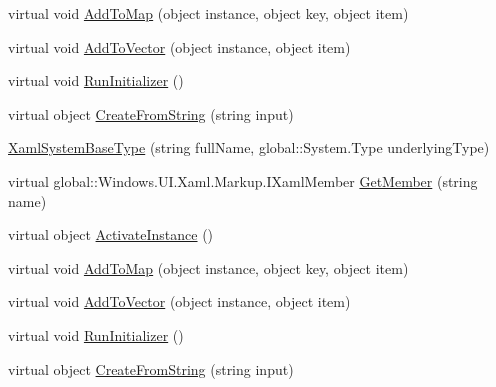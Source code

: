 \begin{DoxyCompactItemize}
\item 
virtual void \hyperlink{class_e_l_i_client_1_1_e_l_i_client___xaml_type_info_1_1_xaml_system_base_type_abd26a6811ca622b1d16bc6b0d0519c2b}{Add\+To\+Map} (object instance, object key, object item)
\item 
virtual void \hyperlink{class_e_l_i_client_1_1_e_l_i_client___xaml_type_info_1_1_xaml_system_base_type_a4c7b8f8e395dc2baec83e13b2520215d}{Add\+To\+Vector} (object instance, object item)
\item 
virtual void \hyperlink{class_e_l_i_client_1_1_e_l_i_client___xaml_type_info_1_1_xaml_system_base_type_a171cdd071c13800c2cd7489b6cfc1010}{Run\+Initializer} ()
\item 
virtual object \hyperlink{class_e_l_i_client_1_1_e_l_i_client___xaml_type_info_1_1_xaml_system_base_type_a0bd52d534da56c352eb100be5f7f400a}{Create\+From\+String} (string input)
\item 
\hyperlink{class_e_l_i_client_1_1_e_l_i_client___xaml_type_info_1_1_xaml_system_base_type_af46ea0fad0966f1ede472ee463183a0d}{Xaml\+System\+Base\+Type} (string full\+Name, global\+::\+System.\+Type underlying\+Type)
\item 
virtual global\+::\+Windows.\+U\+I.\+Xaml.\+Markup.\+I\+Xaml\+Member \hyperlink{class_e_l_i_client_1_1_e_l_i_client___xaml_type_info_1_1_xaml_system_base_type_a4ec754252bc6008baef1bb42484c8971}{Get\+Member} (string name)
\item 
virtual object \hyperlink{class_e_l_i_client_1_1_e_l_i_client___xaml_type_info_1_1_xaml_system_base_type_a3f61df0c415b0904f55ec69f26fc2de9}{Activate\+Instance} ()
\item 
virtual void \hyperlink{class_e_l_i_client_1_1_e_l_i_client___xaml_type_info_1_1_xaml_system_base_type_abd26a6811ca622b1d16bc6b0d0519c2b}{Add\+To\+Map} (object instance, object key, object item)
\item 
virtual void \hyperlink{class_e_l_i_client_1_1_e_l_i_client___xaml_type_info_1_1_xaml_system_base_type_a4c7b8f8e395dc2baec83e13b2520215d}{Add\+To\+Vector} (object instance, object item)
\item 
virtual void \hyperlink{class_e_l_i_client_1_1_e_l_i_client___xaml_type_info_1_1_xaml_system_base_type_a171cdd071c13800c2cd7489b6cfc1010}{Run\+Initializer} ()
\item 
virtual object \hyperlink{class_e_l_i_client_1_1_e_l_i_client___xaml_type_info_1_1_xaml_system_base_type_a0bd52d534da56c352eb100be5f7f400a}{Create\+From\+String} (string input)
\end{DoxyCompactItemize}
